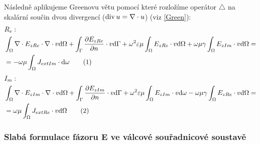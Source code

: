 \documentclass[12pt,a4paper,oneside]{article}
\numberwithin{equation}{section} %
\numberwithin{figure}{section} %
\numberwithin{table}{section} %
\newcommand\numberthis{\addtocounter{equation}{1}\tag{\theequation}}
\begin{document}
Následně aplikujeme Greenovu větu pomocí které rozložíme operátor $\triangle$ na skalární součin dvou divergencí ($\mathop{\rm div}\nolimits u = \nabla \cdot u$) (viz \ref{Green}):
\begin{align*}
&R_e:
\\
&\int _{\Omega} \nabla \cdot E _{zRe} \cdot \nabla \cdot v \ud \Omega + \int _{\Gamma} \frac{\partial E _{zRe}}{\partial n} \cdot v \ud \Gamma + \omega ^2 \varepsilon \mu \int _{\Omega} E _{zRe} \cdot v \ud \Omega + \omega \mu \gamma \int _{\Omega} E _{zIm} \cdot v \ud \Omega = 
\\
&= - \omega \mu \int _{\Omega} J _{extIm} \cdot \ud \omega
\numberthis
\end{align*}
\begin{align*}
&I_m:
\\
&\int _{\Omega} \nabla \cdot E _{zIm} \cdot \nabla \cdot v \ud \Omega + \int _{\Gamma} \frac{\partial E _{zIm}}{\partial n} \cdot v \ud \Gamma + \omega ^2 \varepsilon \mu \int _{\Omega} E _{zIm} \cdot v \ud \omega - \omega \mu \gamma \int _{\Omega} E _{zRe} \cdot v \ud \Omega = 
\\
&= \omega \mu \int _{\Omega} J _{extRe} \cdot v \ud \Omega
\numberthis
\end{align*}


\subsubsection{Slabá formulace fázoru E ve válcové souřadnicové soustavě}
\end{document}
